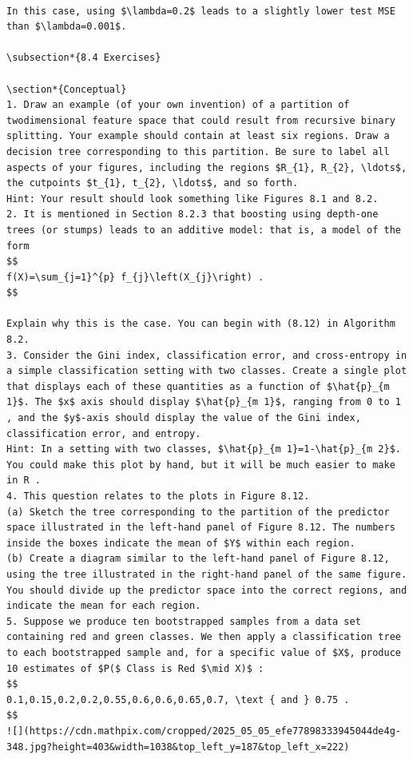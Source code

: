 \documentclass[10pt]{article}
\begin{document}
\begin{verbatim}

In this case, using $\lambda=0.2$ leads to a slightly lower test MSE than $\lambda=0.001$.

\subsection*{8.4 Exercises}

\section*{Conceptual}
1. Draw an example (of your own invention) of a partition of twodimensional feature space that could result from recursive binary splitting. Your example should contain at least six regions. Draw a decision tree corresponding to this partition. Be sure to label all aspects of your figures, including the regions $R_{1}, R_{2}, \ldots$, the cutpoints $t_{1}, t_{2}, \ldots$, and so forth.
Hint: Your result should look something like Figures 8.1 and 8.2.
2. It is mentioned in Section 8.2.3 that boosting using depth-one trees (or stumps) leads to an additive model: that is, a model of the form
$$
f(X)=\sum_{j=1}^{p} f_{j}\left(X_{j}\right) .
$$

Explain why this is the case. You can begin with (8.12) in Algorithm 8.2.
3. Consider the Gini index, classification error, and cross-entropy in a simple classification setting with two classes. Create a single plot that displays each of these quantities as a function of $\hat{p}_{m 1}$. The $x$ axis should display $\hat{p}_{m 1}$, ranging from 0 to 1 , and the $y$-axis should display the value of the Gini index, classification error, and entropy.
Hint: In a setting with two classes, $\hat{p}_{m 1}=1-\hat{p}_{m 2}$. You could make this plot by hand, but it will be much easier to make in R .
4. This question relates to the plots in Figure 8.12.
(a) Sketch the tree corresponding to the partition of the predictor space illustrated in the left-hand panel of Figure 8.12. The numbers inside the boxes indicate the mean of $Y$ within each region.
(b) Create a diagram similar to the left-hand panel of Figure 8.12, using the tree illustrated in the right-hand panel of the same figure. You should divide up the predictor space into the correct regions, and indicate the mean for each region.
5. Suppose we produce ten bootstrapped samples from a data set containing red and green classes. We then apply a classification tree to each bootstrapped sample and, for a specific value of $X$, produce 10 estimates of $P($ Class is Red $\mid X)$ :
$$
0.1,0.15,0.2,0.2,0.55,0.6,0.6,0.65,0.7, \text { and } 0.75 .
$$
![](https://cdn.mathpix.com/cropped/2025_05_05_efe77898333945044de4g-348.jpg?height=403&width=1038&top_left_y=187&top_left_x=222)


\end{verbatim}
\end{document}
